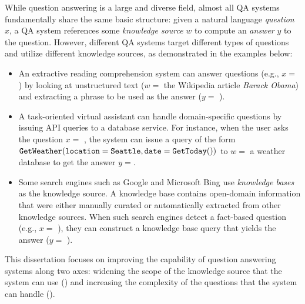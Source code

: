 While question answering is a large and diverse field,
almost all QA systems fundamentally share the same basic structure:
given a natural language \emph{question} $x$,
a QA system references some \emph{knowledge source} $w$
to compute an \emph{answer} $y$ to the question.
However, different QA systems target different types of questions
and utilize different knowledge sources,
as demonstrated in the examples below:

\begin{itemize}
\item
An extractive reading comprehension system
\cite{brill2002askmsr,seo2016bidaf,chen2016thorough}
can answer questions 
(e.g., $x =$ )
by looking at unstructured text
($w =$ the Wikipedia article \emph{Barack Obama})
and extracting a phrase to be used as the answer
($y =$ ).

\item
A task-oriented virtual assistant
\cite{pieraccini1991stochastic,raymond2007generative,mesnil2014using}
can handle domain-specific questions
by issuing API queries to a database service.
For instance, when the user asks the question
$x =$ ,
the system can issue a query of the form
$\texttt{GetWeather}(\texttt{location}=\texttt{Seattle}, \texttt{date}=\texttt{GetToday}())$
to $w =$ a weather database
to get the answer $y =$.

\item
Some search engines such as Google and Microsoft Bing
use \emph{knowledge bases} as the knowledge source.
A knowledge base contains open-domain information that were
either manually curated or automatically extracted from
other knowledge sources.
When such search engines detect a fact-based question
(e.g., $x =$ ),
they can construct a knowledge base query
that yields the answer ($y =$ ).

\end{itemize}

This dissertation focuses on improving
the capability of question answering systems along two axes:
widening the scope of the knowledge source
that the system can use (\Breadth)
and increasing the complexity of the questions
that the system can handle (\Depth).


